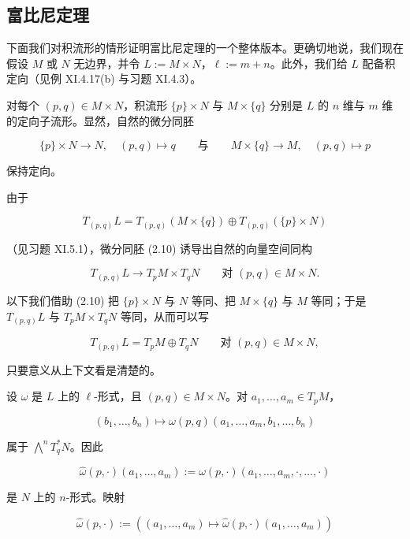 \subsection*{富比尼定理}

下面我们对积流形的情形证明富比尼定理的一个整体版本。更确切地说，我们现在假设 $ M $ 或 $ N $ 无边界，并令 $ L := M \times N $，$ \ell := m + n $。此外，我们给 $ L $ 配备积定向（见例 XI.4.17(b) 与习题 XI.4.3）。

对每个 $ (p,q) \in M \times N $，积流形 $ \{p\} \times N $ 与 $ M \times \{q\} $ 分别是 $ L $ 的 $ n $ 维与 $ m $ 维的定向子流形。显然，自然的微分同胚

\begin{equation}
\{p\} \times N \to N , \quad (p,q) \mapsto q \qquad \text{与} \qquad M \times \{q\} \to M , \quad (p,q) \mapsto p\tag{2.10}
\end{equation}

保持定向。

由于

\[
T_{(p,q)}L = T_{(p,q)}(M \times \{q\}) \oplus T_{(p,q)}(\{p\} \times N)
\]

（见习题 XI.5.1），微分同胚 (2.10) 诱导出自然的向量空间同构

\[
T_{(p,q)}L \to T_p M \times T_q N \qquad \text{对 } (p,q) \in M \times N .
\]

以下我们借助 (2.10) 把 $ \{p\} \times N $ 与 $ N $ 等同、把 $ M \times \{q\} $ 与 $ M $ 等同；于是 $ T_{(p,q)}L $ 与 $ T_p M \times T_q N $ 等同，从而可以写

\begin{equation}
T_{(p,q)}L = T_p M \oplus T_q N \qquad \text{对 } (p,q) \in M \times N ,\tag{2.11}
\end{equation}

只要意义从上下文看是清楚的。

设 $ \omega $ 是 $ L $ 上的 $ \ell $-形式，且 $ (p,q) \in M \times N $。对 $ a_1, \dots, a_m \in T_p M $，

\[
(b_1, \dots, b_n) \mapsto \omega(p,q)(a_1, \dots, a_m, b_1, \dots, b_n)
\]

属于 $ \bigwedge^n T_q^* N $。因此

\[
\widehat{\omega}(p,\cdot)(a_1, \dots, a_m) := \omega(p,\cdot)(a_1, \dots, a_m, \cdot, \dots, \cdot)
\]

是 $ N $ 上的 $ n $-形式。映射

\[
\widehat{\omega}(p,\cdot) := \left( (a_1, \dots, a_m) \mapsto \widehat{\omega}(p,\cdot)(a_1, \dots, a_m) \right)
\]

